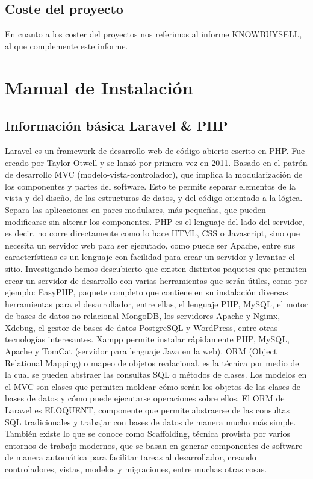 \documentclass{article}
\begin{document}
\subsection{Coste del proyecto}
En cuanto a los coster del proyectos nos referimos al informe KNOWBUYSELL, al que complemente este informe.
\section{Manual de Instalación}
\subsection{Información básica Laravel \& PHP}
Laravel es un framework de desarrollo web de código abierto escrito en PHP. Fue creado por Taylor Otwell y se lanzó por primera vez en 2011. 
Basado en el patrón de desarrollo MVC (modelo-vista-controlador), que implica la modularización de los componentes y partes del software. Esto te permite separar elementos de la vista y del diseño, de las estructuras de datos, y del código orientado a la lógica. Separa las aplicaciones en pares modulares, más pequeñas, que pueden modificarse sin alterar los componentes.
PHP es el lenguaje del lado del servidor, es decir, no corre directamente como lo hace HTML, CSS o Javascript, sino que necesita un servidor web para ser ejecutado, como puede ser Apache, entre sus características es un lenguaje con facilidad para crear un servidor y levantar el sitio.
Investigando hemos descubierto que existen distintos paquetes que permiten crear un servidor de desarrollo con varias herramientas que serán útiles, como por ejemplo: EasyPHP, paquete completo que contiene en su instalación diversas herramientas para el desarrollador, entre ellas, el lenguaje PHP, MySQL, el motor de bases de datos no relacional MongoDB, los servidores Apache y Ngimx, Xdebug, el gestor de bases de datos PostgreSQL y WordPress, entre otras tecnologías interesantes.
Xampp permite instalar rápidamente PHP, MySQL, Apache y TomCat (servidor para lenguaje Java en la web).
ORM (Object Relational Mapping) o mapeo de objetos realacional, es la técnica por medio de la cual se pueden abstraer las consultas SQL o métodos de clases.
Los modelos en el MVC son clases que permiten moldear cómo serán los objetos de las clases de bases de datos y cómo puede ejecutarse operaciones sobre ellos. 
El ORM de Laravel es ELOQUENT, componente que permite abstraerse de las consultas SQL tradicionales y trabajar con bases de datos de manera mucho más simple.
También existe lo que se conoce como Scaffolding, técnica provista por varios entornos de trabajo modernos, que se basan en generar componentes de software de manera automática para facilitar tareas al desarrollador, creando controladores, vistas, modelos y migraciones, entre muchas otras cosas.
\end{document}

